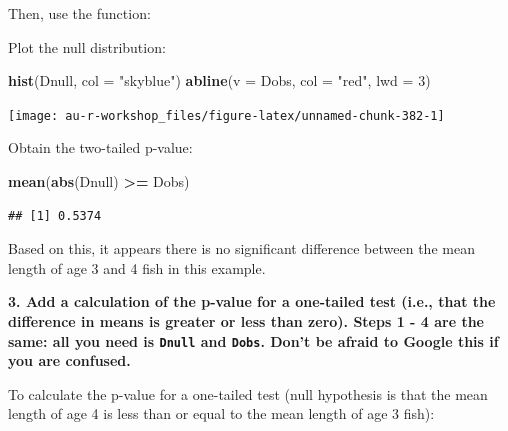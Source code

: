 \documentclass[]{book}
\newenvironment{Shaded}{\begin{snugshade}}{\end{snugshade}}
\newcommand{\KeywordTok}[1]{\textcolor[rgb]{0.13,0.29,0.53}{\textbf{#1}}}
\newcommand{\DataTypeTok}[1]{\textcolor[rgb]{0.13,0.29,0.53}{#1}}
\newcommand{\DecValTok}[1]{\textcolor[rgb]{0.00,0.00,0.81}{#1}}
\newcommand{\StringTok}[1]{\textcolor[rgb]{0.31,0.60,0.02}{#1}}
\newcommand{\OperatorTok}[1]{\textcolor[rgb]{0.81,0.36,0.00}{\textbf{#1}}}
\newcommand{\NormalTok}[1]{#1}
\theoremstyle{definition}
\theoremstyle{definition}
\theoremstyle{definition}
\theoremstyle{remark}
\begin{document}
Then, use the function:

\begin{Shaded}
\end{Shaded}

Plot the null distribution:

\begin{Shaded}
\begin{Highlighting}[]
\KeywordTok{hist}\NormalTok{(Dnull, }\DataTypeTok{col =} \StringTok{"skyblue"}\NormalTok{)}
\KeywordTok{abline}\NormalTok{(}\DataTypeTok{v =}\NormalTok{ Dobs, }\DataTypeTok{col =} \StringTok{"red"}\NormalTok{, }\DataTypeTok{lwd =} \DecValTok{3}\NormalTok{)}
\end{Highlighting}
\end{Shaded}

\begin{center}\texttt{[image: au-r-workshop\_files/figure-latex/unnamed-chunk-382-1]} \end{center}

Obtain the two-tailed p-value:

\begin{Shaded}
\begin{Highlighting}[]
\KeywordTok{mean}\NormalTok{(}\KeywordTok{abs}\NormalTok{(Dnull) }\OperatorTok{>=}\StringTok{ }\NormalTok{Dobs)}
\end{Highlighting}
\end{Shaded}

\begin{verbatim}
## [1] 0.5374
\end{verbatim}

Based on this, it appears there is no significant difference between the
mean length of age 3 and 4 fish in this example.

\textbf{3. Add a calculation of the p-value for a one-tailed test (i.e.,
that the difference in means is greater or less than zero). Steps 1 - 4
are the same: all you need is \texttt{Dnull} and \texttt{Dobs}. Don't be
afraid to Google this if you are confused.}

To calculate the p-value for a one-tailed test (null hypothesis is that
the mean length of age 4 is less than or equal to the mean length of age
3 fish):
\end{document}
